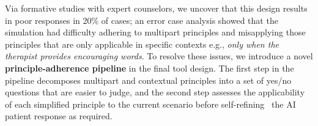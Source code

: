 \documentclass[11pt]{article}
\begin{document}
Via formative studies with expert counselors,
we uncover that this design results in poor responses in 20\% of cases; an error case analysis showed that the simulation had difficulty adhering to multipart principles and misapplying those principles that are only applicable in specific contexts e.g., \textit{only when the therapist provides encouraging words}.
To resolve these issues, we introduce a novel 
\textbf{principle-adherence pipeline
} in the final tool design. The first step in the pipeline decomposes multipart and contextual principles into a set of yes/no questions that are easier to judge, and the second step assesses the applicability of each simplified principle to the current scenario before self-refining~\cite{madaan2023selfrefine} the AI patient response as required.
\fi

\end{document}
